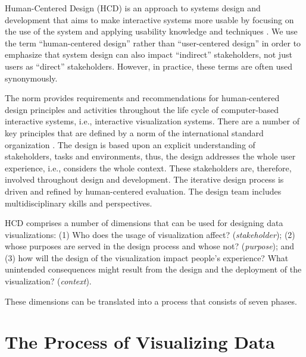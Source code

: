 \documentclass[
]{book}
\begin{document}
Human-Centered Design (HCD) is an approach to systems design and development that aims to make interactive systems more usable by focusing on the use of the system and applying usability knowledge and techniques \citep{international2010ergonomics}. We use the term ``human-centered design'' rather than ``user-centered design'' in order to emphasize that system design can also impact ``indirect'' stakeholders, not just users as ``direct'' stakeholders. However, in practice, these terms are often used synonymously.

The norm provides requirements and recommendations for human-centered design principles and activities throughout the life cycle of computer-based interactive systems, i.e., interactive visualization systems. There are a number of key principles that are defined by a norm of the international standard organization \citep{international2010ergonomics}. The design is based upon an explicit understanding of stakeholders, tasks and environments, thus, the design addresses the whole user experience, i.e., considers the whole context. These stakeholders are, therefore, involved throughout design and development. The iterative design process is driven and refined by human-centered evaluation. The design team includes multidisciplinary skills and perspectives.

HCD comprises a number of dimensions \citep{KlingStar1998_HCD} that can be used for designing data visualizations: (1) Who does the usage of visualization affect? (\emph{stakeholder}); (2) whose purposes are served in the design process and whose not? (\emph{purpose}); and (3) how will the design of the visualization impact people's experience? What unintended consequences might result from the design and the deployment of the visualization? (\emph{context}).

These dimensions can be translated into a process that consists of seven phases.

\hypertarget{the-process-of-visualizing-data}{%
\chapter{The Process of Visualizing Data}\label{the-process-of-visualizing-data}}
\end{document}
